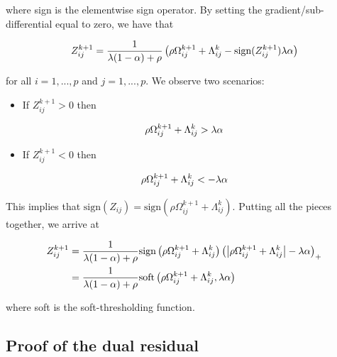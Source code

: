 \documentclass[11pt,]{report}
\providecommand{\tightlist}{%
  \setlength{\itemsep}{0pt}\setlength{\parskip}{0pt}}
\theoremstyle{definition}
\theoremstyle{definition}
\theoremstyle{definition}
\theoremstyle{remark}
\begin{document}
where sign is the elementwise sign operator. By setting the gradient/sub-differential equal to zero, we have that

\begin{equation}
Z_{ij}^{k + 1} = \frac{1}{\lambda(1 - \alpha) + \rho}\left( \rho \Omega_{ij}^{k + 1} + \Lambda_{ij}^{k} - \mbox{sign}(Z_{ij}^{k + 1})\lambda\alpha \right)
\label{eq:ZZsoftproof}\notag
\end{equation}

for all \(i = 1,..., p\) and \(j = 1,..., p\). We observe two scenarios:

\begin{itemize}
\tightlist
\item
  If \(Z_{ij}^{k + 1} > 0\) then
\end{itemize}

\begin{equation}
\rho\Omega_{ij}^{k + 1} + \Lambda_{ij}^{k} > \lambda\alpha \notag
\end{equation}

\begin{itemize}
\tightlist
\item
  If \(Z_{ij}^{k + 1} < 0\) then
\end{itemize}

\begin{equation}
\rho\Omega_{ij}^{k + 1} + \Lambda_{ij}^{k} < -\lambda\alpha \notag
\end{equation}

This implies that \(\mbox{sign}(Z_{ij}) = \mbox{sign}(\rho\Omega_{ij}^{k + 1} + \Lambda_{ij}^{k})\). Putting all the pieces together, we arrive at

\begin{equation}
\begin{split}
Z_{ij}^{k + 1} &= \frac{1}{\lambda(1 - \alpha) + \rho}\mbox{sign}\left(\rho\Omega_{ij}^{k + 1} + \Lambda_{ij}^{k}\right)\left( \left| \rho\Omega_{ij}^{k + 1} + \Lambda_{ij}^{k} \right| - \lambda\alpha \right)_{+} \\
&= \frac{1}{\lambda(1 - \alpha) + \rho}\mbox{soft}\left(\rho\Omega_{ij}^{k + 1} + \Lambda_{ij}^{k}, \lambda\alpha\right)
\end{split}
\label{eq:appendixZZproof}\notag
\end{equation}

where soft is the soft-thresholding function.

\hypertarget{proofdualresidual}{%
\subsection{Proof of the dual residual}\label{proofdualresidual}}
\end{document}
